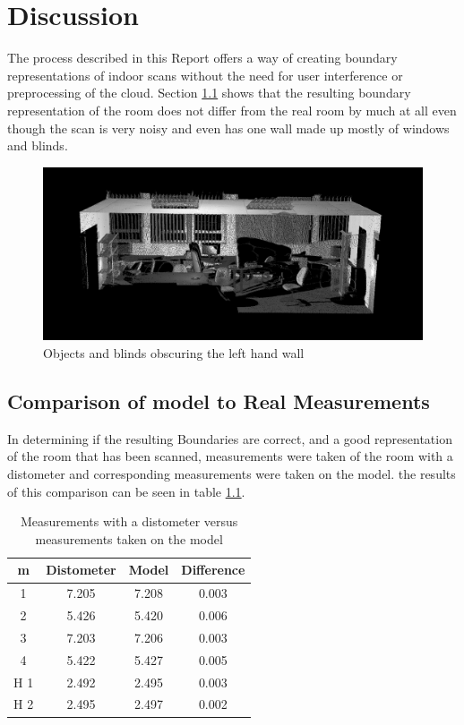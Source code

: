 \chapter{Discussion}
	\label{discussion}
	The process described in this Report offers a way of creating boundary representations of indoor scans without the need for user interference or preprocessing of the cloud. Section \ref{Comparison} shows that the resulting boundary representation of the room does not differ from the real room by much at all even though the scan is very noisy and even has one wall made up mostly of windows and blinds. 
	
	\begin{figure}[H]
	\centering
	\includegraphics[width=0.9\linewidth]{"Includes/images/Results/Messy Wall"}
	\caption{Objects and blinds obscuring the left hand wall}
	\label{fig:MessyWall}
	\end{figure}
	
	
	\section{Comparison of model to Real Measurements}
		\label{Comparison}
		In determining if the resulting Boundaries are correct, and a good representation of the room that has been scanned, measurements were taken of the room with a distometer and corresponding measurements were taken on the model. the results of this comparison can be seen in table \ref{MeasurmensTable}. 
		
		\begin{table}[H]
			\centering
			\begin{tabular}{|c|c|c|c|}
				\hline m & Distometer & Model & Difference \\ 
				\hline 1 & 7.205 & 7.208 & 0.003 \\ 
				\hline 2 & 5.426 & 5.420 & 0.006 \\ 
				\hline 3 & 7.203 & 7.206 & 0.003 \\ 
				\hline 4 & 5.422 & 5.427 & 0.005 \\ 
				\hline H 1 & 2.492 & 2.495 & 0.003 \\ 
				\hline H 2 & 2.495 & 2.497 & 0.002 \\ %
				\hline
			\end{tabular}
			\caption{Measurements with a distometer versus measurements taken on the model}
			\label{MeasurmensTable}
		\end{table}
		
